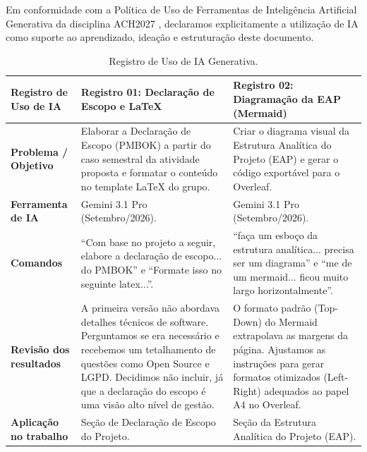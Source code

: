 \documentclass[a4paper]{article}
\begin{document}
Em conformidade com a Política de Uso de Ferramentas de Inteligência Artificial Generativa da disciplina ACH2027 \cite{politicaIA}, declaramos explicitamente a utilização de IA como suporte ao aprendizado, ideação e estruturação deste documento.

\begin{table}[H]
    \centering
    \renewcommand{\arraystretch}{1.5}
    \small
    \begin{tabular}{|>{\raggedright\arraybackslash}p{3cm}|p{6cm}|p{6cm}|}
        \hline
        \rowcolor{eapC}
        \textbf{Registro de Uso de IA} & \textbf{Registro 01: Declaração de Escopo e LaTeX} & \textbf{Registro 02: Diagramação da EAP (Mermaid)} \\
        \hline
        \textbf{Problema / Objetivo} & Elaborar a Declaração de Escopo (PMBOK) a partir do caso semestral da atividade proposta e formatar o conteúdo no template LaTeX do grupo. & Criar o diagrama visual da Estrutura Analítica do Projeto (EAP) e gerar o código exportável para o Overleaf. \\
        \hline
        \textbf{Ferramenta de IA} & Gemini 3.1 Pro (Setembro/2026). & Gemini 3.1 Pro (Setembro/2026). \\
        \hline
        \textbf{Comandos} & \enquote{Com base no projeto a seguir, elabore a declaração de escopo... do PMBOK} e \enquote{Formate isso no seguinte latex...}. & \enquote{faça um esboço da estrutura analítica... precisa ser um diagrama} e \enquote{me de um mermaid... ficou muito largo horizontalmente}. \\
        \hline
        \textbf{Revisão dos resultados} & A primeira versão não abordava detalhes técnicos de software. Perguntamos se era necessário e recebemos um tetalhamento de questões como Open Source e LGPD. Decidimos não incluir, já que a declaração do escopo é uma visão alto nível de gestão. & O formato padrão (Top-Down) do Mermaid extrapolava as margens da página. Ajustamos as instruções para gerar formatos otimizados (Left-Right) adequados ao papel A4 no Overleaf. \\
        \hline
        \textbf{Aplicação no trabalho} & Seção de Declaração de Escopo do Projeto. & Seção da Estrutura Analítica do Projeto (EAP). \\
        \hline
    \end{tabular}
    \caption{Registro de Uso de IA Generativa.}
    \label{tab:uso_ia}
\end{table}
\end{document}
